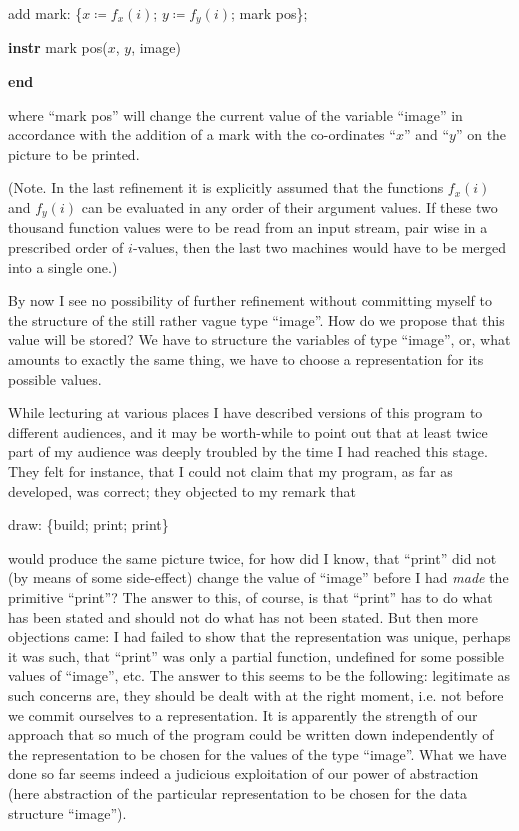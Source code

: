 \quad add mark: \{$x \coloneq f_x(i)$; $y \coloneq f_y(i)$; mark pos\};

\quad\textbf{instr} mark pos($x$, $y$, image)

\textbf{end}

\noindent
where ``mark pos'' will change the current value of the variable ``image'' in accordance with the addition of a mark with the co-ordinates ``$x$'' and ``$y$'' on the picture to be printed.

(Note. In the last refinement it is explicitly assumed that the functions $f_x(i)$ and $f_y(i)$ can be evaluated in any order of their argument values. If these two thousand function values were to be read from an input stream, pair wise in a prescribed order of $i$-values, then the last two machines would have to be merged into a single one.)

By now I see no possibility of further refinement without committing myself to the structure of the still rather vague type ``image''. How do we propose that this value will be stored? We have to structure the variables of type ``image'', or, what amounts to exactly the same thing, we have to choose a representation for its possible values.

While lecturing at various places I have described versions of this program to different audiences, and it may be worth-while to point out that at least twice part of my audience was deeply troubled by the time I had reached this stage. They felt for instance, that I could not claim that my program, as far as developed, was correct; they objected to my remark that

draw: \{build; print; print\}

\noindent
would produce the same picture twice, for how did I know, that ``print'' did not (by means of some side-effect) change the value of ``image'' before I had \textit{made} the primitive ``print''? The answer to this, of course, is that ``print'' has to do what has been stated and should not do what has not been stated. But then more objections came: I had failed to show that the representation was unique, perhaps it was such, that ``print'' was only a partial function, undefined for some possible values of ``image'', etc. The answer to this seems to be the following: legitimate as such concerns are, they should be dealt with at the right moment, i.e. not before we commit ourselves to a representation. It is apparently the strength of our approach that so much of the program could be written down independently of the representation to be chosen for the values of the type ``image''. What we have done so far seems indeed a judicious exploitation of our power of abstraction (here abstraction of the particular representation to be chosen for the data structure ``image'').

